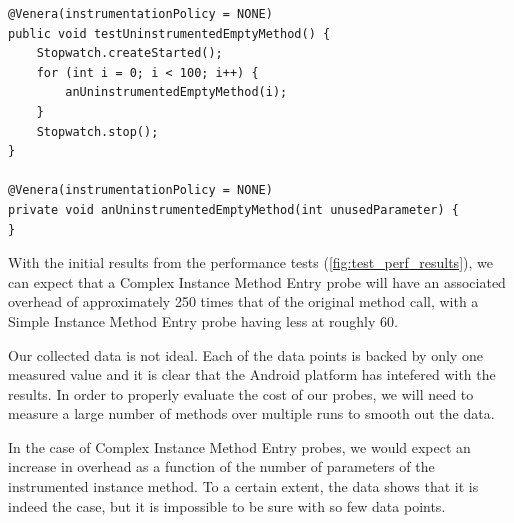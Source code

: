 {\begin{lstlisting}[caption=Uninstrumented Test,label=lst:uninstrumented_test]
@Venera(instrumentationPolicy = NONE)
public void testUninstrumentedEmptyMethod() {
	Stopwatch.createStarted();
	for (int i = 0; i < 100; i++) {
		anUninstrumentedEmptyMethod(i);
	}
	Stopwatch.stop();
}

@Venera(instrumentationPolicy = NONE)
private void anUninstrumentedEmptyMethod(int unusedParameter) {
}
\end{lstlisting}

\begin{figure}[h]

\centering
{}

\caption{}
\label{fig:test_perf_results}
\end{figure}

With the initial results from the performance tests
(\autoref{fig:test_perf_results}), we can expect that a Complex Instance Method
Entry probe will have an associated overhead of approximately 250 times that of
the original method call, with a Simple Instance Method Entry probe having less
at roughly 60.

Our collected data is not ideal. Each of the data points is backed by only one
measured value and it is clear that the Android platform has intefered with
the results. In order to properly evaluate the cost of our probes, we will need
to measure a large number of methods over multiple runs to smooth out the data.

In the case of Complex Instance Method Entry probes, we would expect an increase
in overhead as a function of the number of parameters of the instrumented
instance method. To a certain extent, the data shows that it is indeed the case,
but it is impossible to be sure with so few data points.

}
